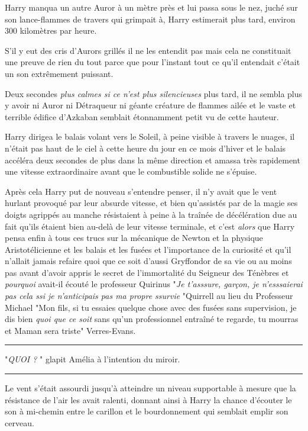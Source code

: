 Harry manqua un autre Auror à un mètre près et lui passa sous le nez, juché sur son lance-flammes de travers qui grimpait à, Harry estimerait plus tard, environ 300 kilomètres par heure.

S'il y eut des cris d'Aurors grillés il ne les entendit pas mais cela ne constituait une preuve de rien du tout parce que pour l'instant tout ce qu'il entendait c'était un son extrêmement puissant.

Deux secondes \emph{plus calmes si ce n'est plus silencieuses } plus tard, il ne sembla plus y avoir ni Auror ni Détraqueur ni géante créature de flammes ailée et le vaste et terrible édifice d'Azkaban semblait étonnamment petit vu de cette hauteur.

Harry dirigea le balais volant vers le Soleil, à peine visible à travers le nuages, il n'était pas haut de le ciel à cette heure du jour en ce mois d'hiver et le balais accéléra deux secondes de plus dans la même direction et amassa très rapidement une vitesse extraordinaire avant que le combustible solide ne s'épuise.

Après cela Harry put de nouveau s'entendre penser, il n'y avait que le vent hurlant provoqué par leur absurde vitesse, et bien qu'assistés par de la magie ses doigts agrippés au manche résistaient à peine à la traînée de décélération due au fait qu'ils étaient bien au-delà de leur vitesse terminale, et c'est \emph{alors}  que Harry pensa enfin à tous ces trucs sur la mécanique de Newton et la physique Aristotélicienne et les balais et les fusées et l'importance de la curiosité et qu'il n'allait jamais refaire quoi que ce soit d'aussi Gryffondor de sa vie ou au moins pas avant d'avoir appris le secret de l'immortalité du Seigneur des Ténèbres et \emph{pourquoi}  avait-il écouté le professeur Quirinus "\emph{Je t'asssure, garçon, je n'esssaierai pas cela ssi je n'anticipais pas ma propre ssurvie} "Quirrell au lieu du Professeur Michael "Mon fils, si tu essaies quelque chose avec des fusées sans supervision, je dis bien \emph{quoi que ce soit}  sans qu'un professionnel entraîné te regarde, tu mourras et Maman sera triste" Verres-Evans.
\par\noindent\rule{\textwidth}{0.4pt}
"\emph{QUOI ?} " glapit Amélia à l'intention du miroir.
\par\noindent\rule{\textwidth}{0.4pt}
Le vent s'était assourdi jusqu'à atteindre un niveau supportable à mesure que la résistance de l'air les avait ralenti, donnant ainsi à Harry la chance d'écouter le son à mi-chemin entre le carillon et le bourdonnement qui semblait emplir son cerveau.

